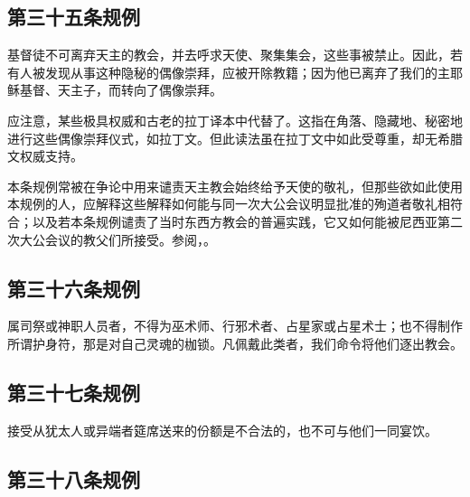 
\subsection{第三十五条规例}

基督徒不可离弃天主的教会，并去呼求天使、聚集集会，这些事被禁止。因此，若有人被发现从事这种隐秘的偶像崇拜，应被开除教籍；因为他已离弃了我们的主耶稣基督、天主子，而转向了偶像崇拜。\par

应注意，某些极具权威和古老的拉丁译本中代替了。这指在角落、隐藏地、秘密地进行这些偶像崇拜仪式，如拉丁文。但此读法虽在拉丁文中如此受尊重，却无希腊文权威支持。\par

本条规例常被在争论中用来谴责天主教会始终给予天使的敬礼，但那些欲如此使用本规例的人，应解释这些解释如何能与同一次大公会议明显批准的殉道者敬礼相符合；以及若本条规例谴责了当时东西方教会的普遍实践，它又如何能被尼西亚第二次大公会议的教父们所接受。参阅，。\par


\subsection{第三十六条规例}

属司祭或神职人员者，不得为巫术师、行邪术者、占星家或占星术士；也不得制作所谓护身符，那是对自己灵魂的枷锁。凡佩戴此类者，我们命令将他们逐出教会。\par


\subsection{第三十七条规例}

接受从犹太人或异端者筵席送来的份额是不合法的，也不可与他们一同宴饮。\par


\subsection{第三十八条规例}

